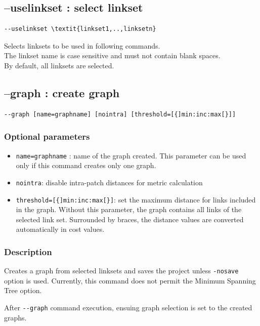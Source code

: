 \documentclass[a4paper,10pt]{report}
\begin{document}
 

\subsection{--uselinkset : select linkset}
\label{uselinkset}
\begin{Verbatim}[commandchars=\\\{\}]
--uselinkset \textit{linkset1,..,linksetn}
\end{Verbatim}
Selects linksets to be used in following commands.\\
The linkset name is case sensitive and must not contain blank spaces.\\
By default, all linksets are selected.

\subsection{--graph : create graph}
\begin{Verbatim}
--graph [name=graphname] [nointra] [threshold=[{]min:inc:max[}]]
\end{Verbatim}

\subsubsection{Optional parameters}
\begin{itemize}
	\item \verb|name=graphname| : name of the graph created. This parameter can be used only if this command creates only one graph.
	\item \verb|nointra|: disable intra-patch distances for metric calculation
	\item \verb|threshold=[{]min:inc:max[}]|: set the maximum distance for links included in the graph. Without this parameter, the graph contains all links of the selected link set. Surrounded by braces, the distance values are converted automatically in cost values.
\end{itemize}

\subsubsection{Description}
Creates a graph from selected linksets and saves the project unless \verb|-nosave| option is used. 
Currently, this command does not permit the Minimum Spanning Tree option.

After \verb|--graph| command execution, ensuing graph selection is set to the created graphs.
\end{document}
